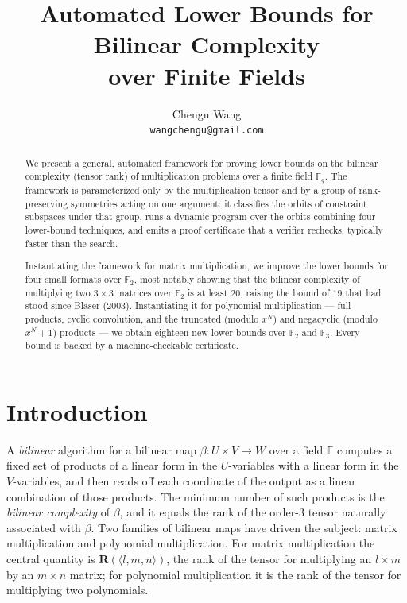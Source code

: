 \documentclass[11pt]{article}
\title{Automated Lower Bounds for Bilinear Complexity\\ over Finite Fields}
\author{Chengu Wang\\ \texttt{wangchengu@gmail.com}}
\date{}
\theoremstyle{definition}
\newcommand{\F}{\mathbb{F}}
\newcommand{\R}{\mathbf{R}}
\newcommand{\mmt}[3]{\langle #1,#2,#3\rangle}
\begin{document}
\maketitle

\begin{abstract}
  We present a general, automated framework for proving lower bounds on the
  bilinear complexity (tensor rank) of multiplication problems over a finite field
  $\mathbb{F}_q$. The framework is parameterized only by the multiplication tensor and by a
  group of rank-preserving symmetries acting on one argument: it classifies
  the orbits of constraint subspaces under that group, runs a dynamic program over
  the orbits combining four lower-bound techniques, and emits a proof certificate
  that a verifier rechecks, typically faster than the search.

  Instantiating the framework for matrix multiplication, we improve the lower bounds
  for four small formats over $\mathbb{F}_2$, most notably showing that
  the bilinear complexity of multiplying two $3 \times 3$ matrices over $\mathbb{F}_2$ is at
  least $20$, raising the bound of $19$ that had stood since Bl\"aser (2003).
  Instantiating it for polynomial multiplication --- full products,
  cyclic convolution, and the truncated (modulo $x^N$) and negacyclic (modulo
  $x^N+1$) products --- we obtain eighteen new lower bounds over $\mathbb{F}_2$ and $\mathbb{F}_3$.
  Every bound is backed by a machine-checkable certificate.
\end{abstract}

\section{Introduction}\label{sec:intro}

A \emph{bilinear} algorithm for a bilinear map $\beta\colon U\times V\to W$ over a
field $\F$ computes a fixed set of products of a linear form in the $U$-variables
with a linear form in the $V$-variables, and then reads off each coordinate of
the output as a linear combination of those products. The minimum number of such
products is the \emph{bilinear complexity} of $\beta$, and it equals the rank of
the order-$3$ tensor naturally associated with $\beta$. Two families of bilinear
maps have driven the subject: matrix multiplication and polynomial
multiplication. For matrix multiplication the central quantity is
$\R(\mmt{l}{m}{n})$, the rank of the tensor for multiplying an $l\times m$ by an
$m\times n$ matrix; for polynomial multiplication it is the rank of the tensor
for multiplying two polynomials.
\end{document}
